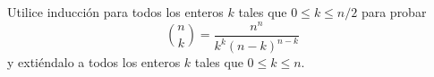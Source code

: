 \begin{statement}{16}
  Utilice inducci\'on para todos los enteros $k$ tales que $0 \leq k \leq n / 2$ para probar
  \[
    \binom{n}{k} = \frac{n^n}{k^k (n - k)^{n - k}}
  \]
  y exti\'endalo a todos los enteros $k$ tales que $0 \leq k \leq n$.
\end{statement}